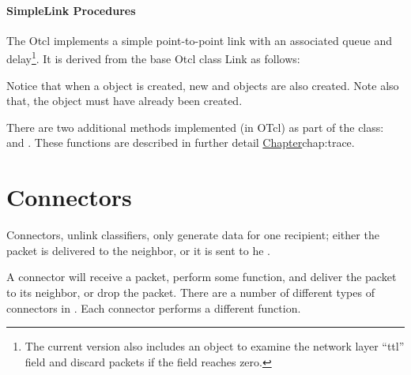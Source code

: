 \paragraph{SimpleLink Procedures}
The Otcl 
implements a simple point-to-point
link with an associated queue and delay\footnote{The current
version also includes an object to examine the
network layer ``ttl'' field and discard packets if the
field reaches zero.}.
It is derived from the base Otcl class Link as follows:
Notice that when a  object is created,
new  and  objects are
also created.
Note also that,
the  object must have already been created.

There are two additional methods implemented (in OTcl) as part
of the  class:  and .
These functions are described in further detail
\href{in the section on tracing}{Chapter}{chap:trace}. 

\section{Connectors}
\label{sec:links:connectors}

Connectors, unlink  classifiers, only generate data for one recipient;
either the packet is delivered to the  neighbor, or it
is sent to he .

A connector will receive a packet, perform some function,
and deliver the packet to its neighbor, or drop the packet.
There are a number of different types of connectors in \ns.
Each connector performs a different function.

